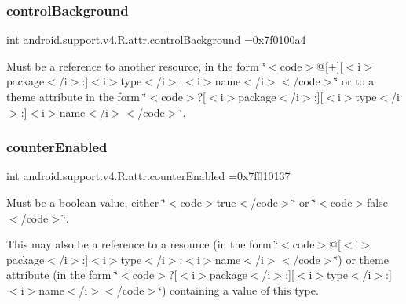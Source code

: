 \subsubsection{\texorpdfstring{control\+Background}{controlBackground}}
{\footnotesize\ttfamily int android.\+support.\+v4.\+R.\+attr.\+control\+Background =0x7f0100a4\hspace{0.3cm}{\ttfamily [static]}}

Must be a reference to another resource, in the form \char`\"{}$<$code$>$@\mbox{[}+\mbox{]}\mbox{[}$<$i$>$package$<$/i$>$\+:\mbox{]}$<$i$>$type$<$/i$>$\+:$<$i$>$name$<$/i$>$$<$/code$>$\char`\"{} or to a theme attribute in the form \char`\"{}$<$code$>$?\mbox{[}$<$i$>$package$<$/i$>$\+:\mbox{]}\mbox{[}$<$i$>$type$<$/i$>$\+:\mbox{]}$<$i$>$name$<$/i$>$$<$/code$>$\char`\"{}. \mbox{\label{classandroid_1_1support_1_1v4_1_1R_1_1attr_a5f0d30d13641754ac1c2587ef5593bca}} 
\subsubsection{\texorpdfstring{counter\+Enabled}{counterEnabled}}
{\footnotesize\ttfamily int android.\+support.\+v4.\+R.\+attr.\+counter\+Enabled =0x7f010137\hspace{0.3cm}{\ttfamily [static]}}

Must be a boolean value, either \char`\"{}$<$code$>$true$<$/code$>$\char`\"{} or \char`\"{}$<$code$>$false$<$/code$>$\char`\"{}. 

This may also be a reference to a resource (in the form \char`\"{}$<$code$>$@\mbox{[}$<$i$>$package$<$/i$>$\+:\mbox{]}$<$i$>$type$<$/i$>$\+:$<$i$>$name$<$/i$>$$<$/code$>$\char`\"{}) or theme attribute (in the form \char`\"{}$<$code$>$?\mbox{[}$<$i$>$package$<$/i$>$\+:\mbox{]}\mbox{[}$<$i$>$type$<$/i$>$\+:\mbox{]}$<$i$>$name$<$/i$>$$<$/code$>$\char`\"{}) containing a value of this type. \mbox{\label{classandroid_1_1support_1_1v4_1_1R_1_1attr_af7b9dc9bb16b5e873c55ef844c21a8e3}} 

